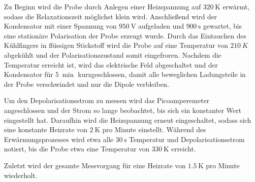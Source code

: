 Zu Beginn wird die Probe durch Anlegen einer Heizspannung auf $\SI{320}{\K}$ erwärmt, sodass die 
Relaxationszeit möglichst klein wird.
Anschließend wird der Kondensator mit einer Spannung von $\SI{950}{\V}$ aufgeladen und $\SI{900}{\s}$ gewartet, bis eine stationäre Polarisation der Probe erzeugt wurde.
Durch das Eintauchen des Kühlfingers in flüssigen Stickstoff wird die Probe auf eine Temperatur von $\SI{210}{K}$ abgekühlt und der Polarisationszustand somit eingefroren.
Nachdem die Temperatur erreicht ist, wird das elektrische Feld abgeschaltet und der Kondensator für $\SI{5}{\min}$ kurzgeschlossen, damit alle beweglichen Ladungsteile in der Probe verschwindet und nur die Dipole verbleiben.

Um den Depolarisationsstrom zu messen wird das Picoamperemeter angeschlossen und der Strom so lange beobachtet, bis sich ein konstanter Wert eingestellt hat.
Daraufhin wird die Heizspannung erneut eingeschaltet, sodass sich eine konstante Heizrate von $\SI{2}{\K}$ pro Minute einstellt.
Während des Erwärmungsprozesses wird etwa alle $\SI{30}{\s}$ Temperatur und Depolarisationsstrom notiert, bis die Probe etwa eine Temperatur von $\SI{330}{\K}$ erreicht.

Zuletzt wird der gesamte Messvorgang für eine Heizrate von $\SI{1,5}{\K}$ pro Minute wiederholt.

